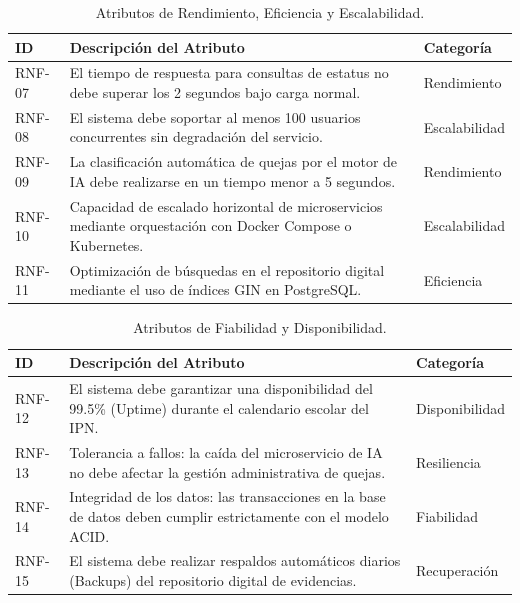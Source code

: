 \begin{table}[h!]
\centering
\scriptsize
\caption{Atributos de Rendimiento, Eficiencia y Escalabilidad.}
\label{tab:rnf_rendimiento}
\begin{tabular}{@{} l p{9.5cm} l @{}}
\toprule
\rowcolor[HTML]{2D3E50} 
\textbf{\color[HTML]{FFFFFF} ID} & \textbf{\color[HTML]{FFFFFF} Descripción del Atributo} & \textbf{\color[HTML]{FFFFFF} Categoría} \\ \midrule
RNF-07 & El tiempo de respuesta para consultas de estatus no debe superar los 2 segundos bajo carga normal. & Rendimiento \\
\rowcolor[HTML]{F2F4F7} 
RNF-08 & El sistema debe soportar al menos 100 usuarios concurrentes sin degradación del servicio. & Escalabilidad \\
RNF-09 & La clasificación automática de quejas por el motor de IA debe realizarse en un tiempo menor a 5 segundos. & Rendimiento \\
\rowcolor[HTML]{F2F4F7} 
RNF-10 & Capacidad de escalado horizontal de microservicios mediante orquestación con Docker Compose o Kubernetes. & Escalabilidad \\
RNF-11 & Optimización de búsquedas en el repositorio digital mediante el uso de índices GIN en PostgreSQL. & Eficiencia \\ \bottomrule
\end{tabular}
\end{table}

\begin{table}[h!]
\centering
\scriptsize
\caption{Atributos de Fiabilidad y Disponibilidad.}
\label{tab:rnf_fiabilidad}
\begin{tabular}{@{} l p{9.5cm} l @{}}
\toprule
\rowcolor[HTML]{2D3E50} 
\textbf{\color[HTML]{FFFFFF} ID} & \textbf{\color[HTML]{FFFFFF} Descripción del Atributo} & \textbf{\color[HTML]{FFFFFF} Categoría} \\ \midrule
RNF-12 & El sistema debe garantizar una disponibilidad del 99.5\% (Uptime) durante el calendario escolar del IPN. & Disponibilidad \\
\rowcolor[HTML]{F2F4F7} 
RNF-13 & Tolerancia a fallos: la caída del microservicio de IA no debe afectar la gestión administrativa de quejas. & Resiliencia \\
RNF-14 & Integridad de los datos: las transacciones en la base de datos deben cumplir estrictamente con el modelo ACID. & Fiabilidad \\
\rowcolor[HTML]{F2F4F7} 
RNF-15 & El sistema debe realizar respaldos automáticos diarios (Backups) del repositorio digital de evidencias. & Recuperación \\ \bottomrule
\end{tabular}
\end{table}

